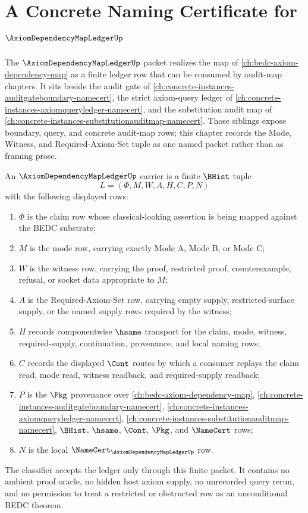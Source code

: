 \chapter{A Concrete Naming Certificate for $\AxiomDependencyMapLedgerUp$}
\label{ch:concrete-instances-axiomdependencymapledger-namecert}

The $\AxiomDependencyMapLedgerUp$ packet realizes the map of \autoref{ch:bedc-axiom-dependency-map} as a finite ledger row that can be consumed by audit-map chapters. It sits beside the audit gate of \autoref{ch:concrete-instances-auditgateboundary-namecert}, the strict axiom-query ledger of \autoref{ch:concrete-instances-axiomqueryledger-namecert}, and the substitution audit map of \autoref{ch:concrete-instances-substitutionauditmap-namecert}. Those siblings expose boundary, query, and concrete audit-map rows; this chapter records the Mode, Witness, and Required-Axiom-Set tuple as one named packet rather than as framing prose.

\begin{definition}
\label{def:axiom-dependency-map-ledger-carrier}
An $\AxiomDependencyMapLedgerUp$ carrier is a finite $\BHist$ tuple
$$
L=(\Phi,M,W,A,H,C,P,N)
$$
with the following displayed rows:
\begin{enumerate}
\item $\Phi$ is the claim row whose classical-looking assertion is being mapped against the BEDC substrate;
\item $M$ is the mode row, carrying exactly Mode A, Mode B, or Mode C;
\item $W$ is the witness row, carrying the proof, restricted proof, counterexample, refusal, or socket data appropriate to $M$;
\item $A$ is the Required-Axiom-Set row, carrying empty supply, restricted-surface supply, or the named supply rows required by the witness;
\item $H$ records componentwise $\hsame$ transport for the claim, mode, witness, required-supply, continuation, provenance, and local naming rows;
\item $C$ records the displayed $\Cont$ routes by which a consumer replays the claim read, mode read, witness readback, and required-supply readback;
\item $P$ is the $\Pkg$ provenance over \autoref{ch:bedc-axiom-dependency-map}, \autoref{ch:concrete-instances-auditgateboundary-namecert}, \autoref{ch:concrete-instances-axiomqueryledger-namecert}, \autoref{ch:concrete-instances-substitutionauditmap-namecert}, $\BHist$, $\hsame$, $\Cont$, $\Pkg$, and $\NameCert$ rows;
\item $N$ is the local $\NameCert_{\AxiomDependencyMapLedgerUp}$ row.
\end{enumerate}
The classifier accepts the ledger only through this finite packet. It contains no ambient proof oracle, no hidden host axiom supply, no unrecorded query rerun, and no permission to treat a restricted or obstructed row as an unconditional BEDC theorem.
\end{definition}

